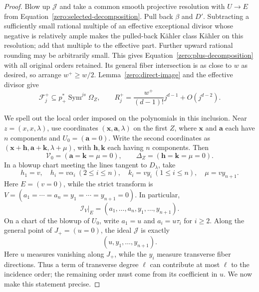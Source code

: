 \begin{proof}
Blow up \(\mathcal J\) and take a common smooth projective resolution
with \(U\to E\) from Equation~\eqref{zero:selected-decomposition}.  Pull back
\(\beta\) and \(D'\).  Subtracting a sufficiently small rational
multiple of an effective exceptional divisor whose negative is
relatively ample makes the pulled-back Kähler class Kähler on this
resolution; add that multiple to the effective part.  Further upward
rational rounding may be
arbitrarily small.  This gives Equation~\eqref{zero:plus-decomposition} with all
original orders retained.  Its general fiber intersection is as close
to \(w\) as desired, so arrange \(w^+\ge w/2\).  Lemma~\ref{zero:direct-image}
and the effective divisor give
\begin{equation}\label{zero:plus-rank}
 \mathcal F_j^+\subseteq p_+^*\operatorname{Sym}^{js}\Omega_Z,\qquad
 R_j^+=\frac{w^+}{(d-1)!}j^{d-1}+O(j^{d-2}).
\end{equation}

We spell out the local order imposed on the polynomials in this
inclusion.  Near \(z=(x,x,\lambda)\), use coordinates
\((\mathbf x,\mathbf a,\lambda)\) on the first \(Z\), where \(\mathbf x\)
and \(\mathbf a\) each have \(n\) components and \(U_0=(\mathbf a=0)\).
Write the second coordinates as
\((\mathbf x+\mathbf h,\mathbf a+\mathbf k,\lambda+\mu)\), with
\(\mathbf h,\mathbf k\) each having \(n\)
components.  Then
\[
 \mathcal V_0=(\mathbf a=\mathbf k=\mu=0),\qquad
 \Delta_Z=(\mathbf h=\mathbf k=\mu=0).
\]
In a blowup chart meeting the lines tangent to \(D_\lambda\), take
\[
 h_1=v,\quad h_i=v\alpha_i\ (2\le i\le n),\quad
 k_i=vy_i\ (1\le i\le n),\quad \mu=vy_{n+1}.
\]
Here \(E=(v=0)\), while the strict transform is
\(V=(a_1=\cdots=a_n=y_1=\cdots=y_{n+1}=0)\).
In particular,
\begin{equation}\label{zero:ideal-before}
 \mathcal I_V|_E=(a_1,\ldots,a_n,y_1,\ldots,y_{n+1}).
\end{equation}
On a chart of the blowup of \(U_0\), write
\(a_1=u\) and \(a_i=u\tau_i\) for \(i\ge2\).  Along the general point
of \(J_+=(u=0)\), the ideal \(\mathcal J\) is exactly
\begin{equation}\label{zero:joint-ideal}
 (u,y_1,\ldots,y_{n+1}).
\end{equation}
Here \(u\) measures vanishing along \(J_+\), while the \(y_i\) measure
transverse fiber directions.  Thus a term of transverse degree \(\ell\)
can contribute at most \(\ell\) to the incidence order; the remaining
order must come from its coefficient in \(u\).  We now make this statement
precise.


\end{proof}
